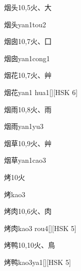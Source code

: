\begin{Entry}{烟头}{10,5}{⽕、⼤}
  \begin{Phonetics}{烟头}{yan1tou2}
  \end{Phonetics}
\end{Entry}

\begin{Entry}{烟囱}{10,7}{⽕、⼞}
  \begin{Phonetics}{烟囱}{yan1cong1}
  \end{Phonetics}
\end{Entry}

\begin{Entry}{烟花}{10,7}{⽕、⾋}
  \begin{Phonetics}{烟花}{yan1 hua1}[][HSK 6]
  \end{Phonetics}
\end{Entry}

\begin{Entry}{烟雨}{10,8}{⽕、⾬}
  \begin{Phonetics}{烟雨}{yan1yu3}
  \end{Phonetics}
\end{Entry}

\begin{Entry}{烟草}{10,9}{⽕、⾋}
  \begin{Phonetics}{烟草}{yan1cao3}
  \end{Phonetics}
\end{Entry}

\begin{Entry}{烤}{10}{⽕}
  \begin{Phonetics}{烤}{kao3}
  \end{Phonetics}
\end{Entry}

\begin{Entry}{烤肉}{10,6}{⽕、⾁}
  \begin{Phonetics}{烤肉}{kao3 rou4}[][HSK 5]
  \end{Phonetics}
\end{Entry}

\begin{Entry}{烤鸭}{10,10}{⽕、⿃}
  \begin{Phonetics}{烤鸭}{kao3ya1}[][HSK 5]
  \end{Phonetics}
\end{Entry}

